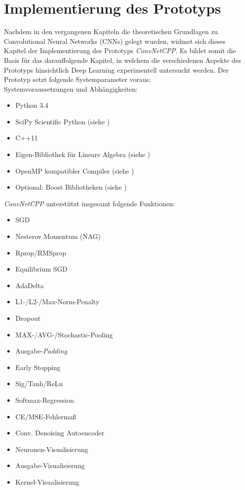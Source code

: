 \chapter{Implementierung des Prototyps}
Nachdem in den vergangenen Kapiteln die theoretischen Grundlagen zu Convolutional Neural Networks (CNNs) gelegt wurden, widmet sich dieses Kapitel der Implementierung des Prototyps \textit{ConvNetCPP}. Es bildet somit die Basis für das darauffolgende Kapitel, in welchem die verschiedenen Aspekte des Prototyps hinsichtlich Deep Learning experimentell untersucht werden.
Der Prototyp setzt folgende Systemparameter voraus: \\

Systemvoraussetzungen und Abhängigkeiten:
\begin{itemize}
\item Python 3.4
\item SciPy \textemdash\space Scientific Python (siehe \cite{Scipy})
\item C++11
\item Eigen-Bibliothek für Lineare Algebra  (siehe \cite{eigenweb})
\item OpenMP kompatibler Compiler (siehe  \cite{openmp08})
\item Optional: Boost Bibliotheken (siehe \cite{Schling2011})
\end{itemize}

\textit{ConvNetCPP} unterstützt insgesamt folgende Funktionen:
\begin{multicols}{2}
\begin{itemize}
\item SGD  
\item Nesterov Momentum (NAG)
\item Rprop/RMSprop
\item Equilibrium SGD
\item AdaDelta
\item L1-/L2-/Max-Norm-Penalty
\item Dropout
\item MAX-/AVG-/Stochastic-Pooling
\item Ausgabe-\textit{Padding}
\item Early Stopping
\item Sig/Tanh/ReLu
\item Softmax-Regression
\item CE/MSE-Fehlermaß
\item Conv. Denoising Autoencoder
\item Neuronen-Visualisierung
\item Ausgabe-Visualisierung 
\item Kernel-Visualisierung
\end{itemize}
\end{multicols}

